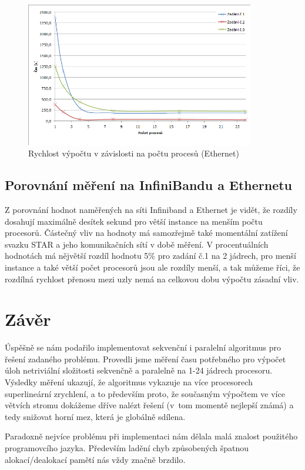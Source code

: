 \documentclass[12pt]{article}
\begin{document}
\begin{figure}[h]
\begin{center}
\includegraphics[width=100mm]{cpu_time_ethernet.png}
\caption{Rychlost výpočtu v závislosti na počtu procesů (Ethernet)}
\label{fig:ct_inifini}
\end{center}
\end{figure}


\subsection{Porovnání měření na InfiniBandu a Ethernetu}
Z porovnání hodnot naměřených na síti Infiniband a Ethernet je vidět, že rozdíly
dosahují maximálně desítek sekund pro větší instance na menším počtu procesorů.
Částečný vliv na hodnoty má samozřejmě také momentální zatížení svazku STAR a
jeho komunikačních sítí v době měření. V procentuálních hodnotách má nějvětší
rozdíl hodnotu 5\% pro zadání č.1 na 2 jádrech, pro menší instance a také větší
počet procesorů jsou ale rozdíly menší, a tak můžeme říci, že rozdílná rychlost
přenosu mezi uzly nemá na celkovou dobu výpočtu zásadní vliv.

\section{Závěr}

Úspěšně se nám podařilo implementovat sekvenční i paralelní algoritmus pro
řešení zadaného problému. Provedli jsme měření času potřebného pro výpočet úloh
netriviální složitosti sekvenčně a paralelně na 1-24 jádrech procesoru. Výsledky
měření ukazují, že algoritmus vykazuje na více procesorech superlineární
zrychlení, a to především proto, že současným  výpočtem ve více větvích stromu
dokážeme dříve nalézt  řešení (v~tom momentě nejlepší známá) a tedy snižovat horní mez, která je
globálně sdílena. 

Paradoxně nejvíce problému při implementaci nám dělala malá znalost použitého
programovcího jazyka. Především ladění chyb způsobených špatnou
alokací/dealokací pamětí nás vždy značně brzdilo.
\end{document}

